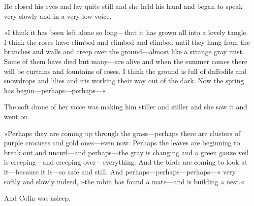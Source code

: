 He closed his eyes and lay quite still and she held his hand and began to speak very slowly and in a very low voice.

»I think it has been left alone so long—that it has grown all into a lovely tangle. I think the roses have climbed and climbed and climbed until they hang from the branches and walls and creep over the ground—almost like a strange gray mist. Some of them have died but many—are alive and when the summer comes there will be curtains and fountains of roses. I think the ground is full of daffodils and snowdrops and lilies and iris working their way out of the dark. Now the spring has begun—perhaps—perhaps—«

The soft drone of her voice was making him stiller and stiller and she saw it and went on.

»Perhaps they are coming up through the grass—perhaps there are clusters of purple crocuses and gold ones—even now. Perhaps the leaves are beginning to break out and uncurl—and perhaps—the gray is changing and a green gauze veil is creeping—and creeping over—everything. And the birds are coming to look at it—because it is—so safe and still. And perhaps—perhaps—perhaps—« very softly and slowly indeed, »the robin has found a mate—and is building a nest.«

And Colin was asleep.